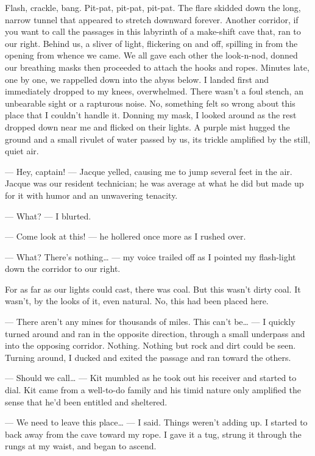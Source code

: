  \noindent 
Flash, crackle, bang. Pit-pat, pit-pat, pit-pat. The flare skidded down the long, narrow tunnel that appeared to stretch downward forever. Another corridor, if you want to call the passages in this labyrinth of a make-shift cave that, ran to our right. Behind us, a sliver of light, flickering on and off, spilling in from the opening from whence we came. We all gave each other the look-n-nod, donned our breathing masks then proceeded to attach the hooks and ropes. Minutes late, one by one, we rappelled down into the abyss below. I landed first and immediately dropped to my knees, overwhelmed. There wasn't a foul stench, an unbearable sight or a rapturous noise. No, something felt so wrong about this place that I couldn't handle it. Donning my mask, I looked around as the rest dropped down near me and flicked on their lights. A purple mist hugged the ground and a small rivulet of water passed by us, its trickle amplified by the still, quiet air.

--- Hey, captain! --- Jacque yelled, causing me to jump several feet in the air. Jacque was our resident technician; he was average at what he did but made up for it with humor and an unwavering tenacity.

--- What? --- I blurted.

--- Come look at this! --- he hollered once more as I rushed over.

--- What? There's nothing\ldots{} --- my voice trailed off as I pointed my flash-light down the corridor to our right.

For as far as our lights could cast, there was coal. But this wasn't dirty coal. It wasn't, by the looks of it, even natural. No, this had been placed here.

--- There aren't any mines for thousands of miles. This can't be\ldots{} --- I quickly turned around and ran in the opposite direction, through a small underpass and into the opposing corridor. Nothing. Nothing but rock and dirt could be seen. Turning around, I ducked and exited the passage and ran toward the others.

--- Should we call\ldots{} --- Kit mumbled as he took out his receiver and started to dial. Kit came from a well-to-do family and his timid nature only amplified the sense that he'd been entitled and sheltered.

--- We need to leave this place\ldots{} --- I said. Things weren't adding up. I started to back away from the cave toward my rope. I gave it a tug, strung it through the rungs at my waist, and began to ascend.

